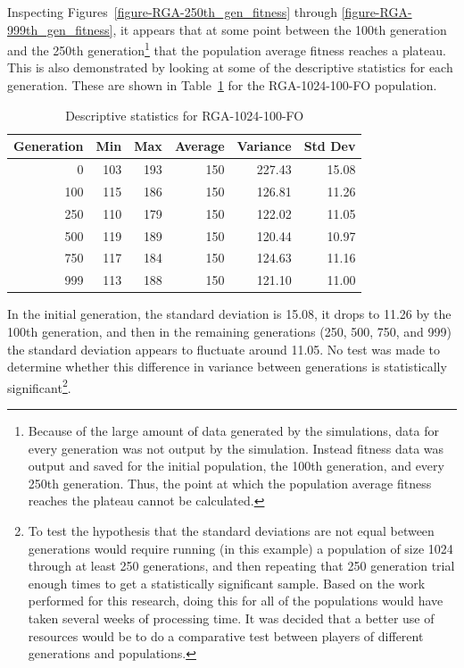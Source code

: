 Inspecting Figures~\ref{figure-RGA-250th_gen_fitness} through
\ref{figure-RGA-999th_gen_fitness}, it appears that at some point between the
100th generation and the 250th generation\footnote{Because of the large amount
of data generated by the simulations, data for every generation was not output
by the simulation. Instead fitness data was output and saved for the initial
population, the 100th generation, and every 250th generation. Thus, the point at
which the population average fitness reaches the plateau cannot be calculated.}
that the population average fitness reaches a plateau. This is also demonstrated
by looking at some of the descriptive statistics for each generation. These are
shown in Table~\ref{table-stats-for-s1024-n100-fo} for the RGA-1024-100-FO
population.

\begin{table}[ht]
\begin{center}
\caption[RGA-1024-100-FO statistics]{Descriptive statistics for RGA-1024-100-FO}
\begin{tabular}{ | r || r | r | r | r | r |}
\hline
Generation & Min & Max & Average & Variance & Std Dev \\ \hline \hline
0   & 103 & 193 & 150 & 227.43 & 15.08 \\ \hline
100 & 115 & 186 & 150 & 126.81 & 11.26 \\ \hline
250 & 110 & 179 & 150 & 122.02 & 11.05 \\ \hline
500 & 119 & 189 & 150 & 120.44 & 10.97 \\ \hline
750 & 117 & 184 & 150 & 124.63 & 11.16 \\ \hline
999 & 113 & 188 & 150 & 121.10 & 11.00 \\ \hline
\end{tabular}
\label{table-stats-for-s1024-n100-fo}
\end{center}
\end{table}

In the initial generation, the standard deviation is 15.08, it drops to 11.26 by
the 100th generation, and then in the remaining generations (250, 500, 750, and
999) the standard deviation appears to fluctuate around 11.05. No test was
made to determine whether this difference in variance between
generations is statistically significant\footnote{To test the hypothesis that the standard
deviations are not equal between generations would require running (in this
example) a population of size 1024 through at least 250 generations, and then
repeating that 250 generation trial enough times to get a statistically
significant sample. Based on the work performed for this research, doing this
for all of the populations would have taken several weeks of processing
time. It was decided that a better use of resources would be to do a comparative
test between players of different generations and populations.}.

